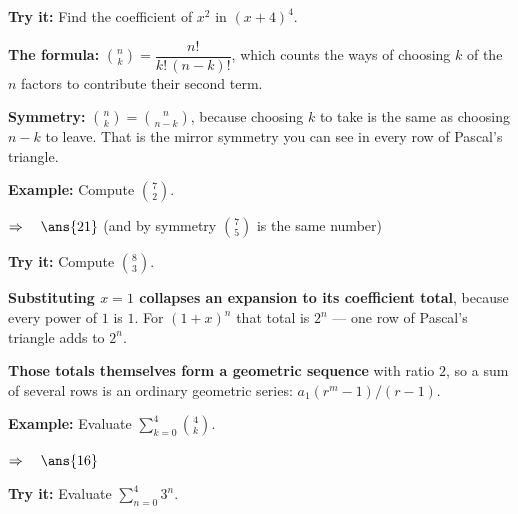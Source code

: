 \documentclass[12pt]{article}
\begin{document}
\begin{tryitbox}
\textbf{Try it:} \quad Find the coefficient of $x^2$ in $(x + 4)^4$.\\[2pt]
\end{tryitbox}


\begin{formulabox}
\textbf{The formula:} $\binom{n}{k} = \dfrac{n!}{k!\,(n-k)!}$, which counts the ways of
choosing $k$ of the $n$ factors to contribute their second term.\par
\textbf{Symmetry:} $\binom{n}{k} = \binom{n}{n-k}$, because choosing $k$ to take is the same
as choosing $n - k$ to leave. That is the mirror symmetry you can see in every row of
Pascal's triangle.
\end{formulabox}

\begin{examplebox}
\textbf{Example:} \quad Compute $\binom{7}{2}$.

$\Rightarrow\quad \ans{21}$ \quad (and by symmetry $\binom{7}{5}$ is the same number)
\end{examplebox}

\begin{tryitbox}
\textbf{Try it:} \quad Compute $\binom{8}{3}$.\\[2pt]
\end{tryitbox}


\begin{formulabox}
\textbf{Substituting $x = 1$ collapses an expansion to its coefficient total}, because every
power of $1$ is $1$. For $(1 + x)^n$ that total is $2^n$ --- one row of Pascal's triangle
adds to $2^n$.\par
\textbf{Those totals themselves form a geometric sequence} with ratio $2$, so a sum of
several rows is an ordinary geometric series: $a_1(r^{m} - 1)/(r - 1)$.
\end{formulabox}

\begin{examplebox}
\textbf{Example:} \quad Evaluate $\displaystyle\sum_{k=0}^{4}\binom{4}{k}$.

$\Rightarrow\quad \ans{16}$
\end{examplebox}

\begin{tryitbox}
\textbf{Try it:} \quad Evaluate $\displaystyle\sum_{n=0}^{4} 3^n$.\\[2pt]
\end{tryitbox}
\end{document}
